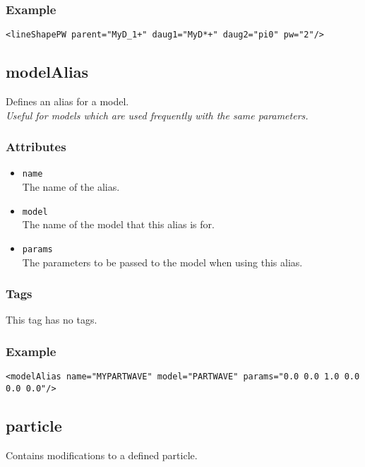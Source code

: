 \subsubsection*{Example}
{\footnotesize
\begin{verbatim}
<lineShapePW parent="MyD_1+" daug1="MyD*+" daug2="pi0" pw="2"/>
\end{verbatim}
}

\subsection{modelAlias}
Defines an alias for a model.\\
\emph{Useful for models which are used frequently with the same parameters.}
\subsubsection*{Attributes}
\begin{itemize}
\item{\tt name}\\
      The name of the alias.
\item{\tt model}\\
      The name of the model that this alias is for.
\item{\tt params}\\
      The parameters to be passed to the model when using this alias.
\end{itemize}
\subsubsection*{Tags}
This tag has no tags.
\subsubsection*{Example}
{\footnotesize
\begin{verbatim}
<modelAlias name="MYPARTWAVE" model="PARTWAVE" params="0.0 0.0 1.0 0.0 0.0 0.0"/>
\end{verbatim}
}

\subsection{particle}
Contains modifications to a defined particle.
